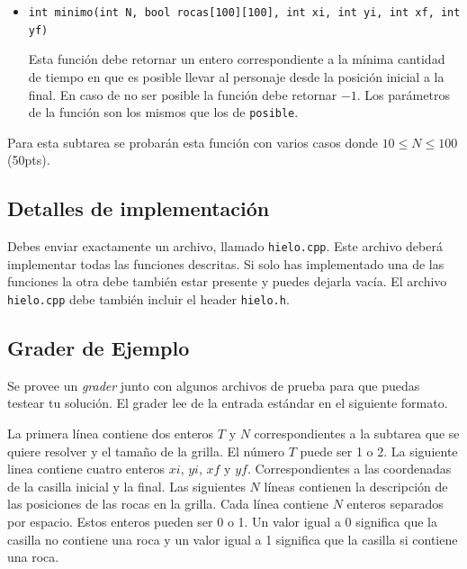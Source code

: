\documentclass{oci}
\begin{document}
\begin{itemize}
	\item \verb+int minimo(int N, bool rocas[100][100], int xi, int yi, int xf, int yf)+

	Esta función debe retornar un entero correspondiente a la mínima cantidad de tiempo en que es posible llevar al personaje desde la posición inicial a la final.
  En caso de no ser posible la función debe retornar $-1$.
  Los parámetros de la función son los mismos que los de \verb+posible+.
\end{itemize}

Para esta subtarea se probarán esta función con varios casos donde $10 \leq N\leq 100$ (50pts).

\subsection*{Detalles de implementación}
Debes enviar exactamente un archivo, llamado \verb+hielo.cpp+.
Este archivo deberá implementar todas las funciones descritas.
Si solo has implementado una de las funciones la otra debe también estar presente y puedes dejarla vacía.
El archivo \verb+hielo.cpp+ debe también incluir el header \verb+hielo.h+.

\subsection*{Grader de Ejemplo}
Se provee un \emph{grader} junto con algunos archivos de prueba para que puedas testear tu solución.
El grader lee de la entrada estándar en el siguiente formato.

La primera línea contiene dos enteros $T$ y $N$ correspondientes a la subtarea que se quiere resolver y el tamaño de la grilla.
El número $T$ puede ser 1 o 2.
La siguiente linea contiene cuatro enteros $xi$, $yi$, $xf$ y $yf$.
Correspondientes a las coordenadas de la casilla inicial y la final.
Las siguientes $N$ líneas contienen la descripción de las posiciones de las rocas en la grilla.
Cada línea contiene $N$ enteros separados por espacio.
Estos enteros pueden ser 0 o 1.
Un valor igual a 0 significa que la casilla no contiene una roca y un valor igual a 1 significa que la casilla si contiene una roca.
\end{document}
